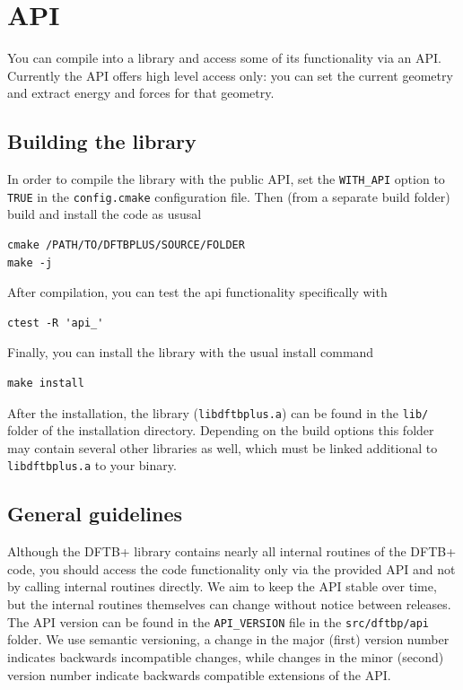 \chapter{\dftbp{} API}

You can compile \dftbp{} into a library and access some of its functionality via
an API. Currently the API offers high level access only: you can set the current
geometry and extract energy and forces for that geometry.

\section{Building the library}

In order to compile the \dftbp{} library with the public API, set the
\verb|WITH_API| option to \verb|TRUE| in the \verb|config.cmake| configuration
file. Then (from a separate build folder) build and install the code as ususal
\begin{verbatim}
cmake /PATH/TO/DFTBPLUS/SOURCE/FOLDER
make -j
\end{verbatim}

After compilation, you can test the api functionality specifically with
\begin{verbatim}
ctest -R 'api_'
\end{verbatim}

Finally, you can install the library with the usual install command
\begin{verbatim}
make install
\end{verbatim}

After the installation, the library (\verb|libdftbplus.a|) can be found in the
\verb|lib/| folder of the installation directory. Depending on the build options
this folder may contain several other libraries as well, which must be linked
additional to \verb|libdftbplus.a| to your binary.

\section{General guidelines}

Although the DFTB+ library contains nearly all internal routines of the DFTB+
code, you should access the code functionality only via the provided API and not
by calling internal routines directly. We aim to keep the API stable over time,
but the internal routines themselves can change without notice between
releases. The API version can be found in the \verb|API_VERSION| file in the
\verb|src/dftbp/api| folder. We use semantic versioning, a change in the
major (first) version number indicates backwards incompatible changes, while
changes in the minor (second) version number indicate backwards compatible
extensions of the API.

